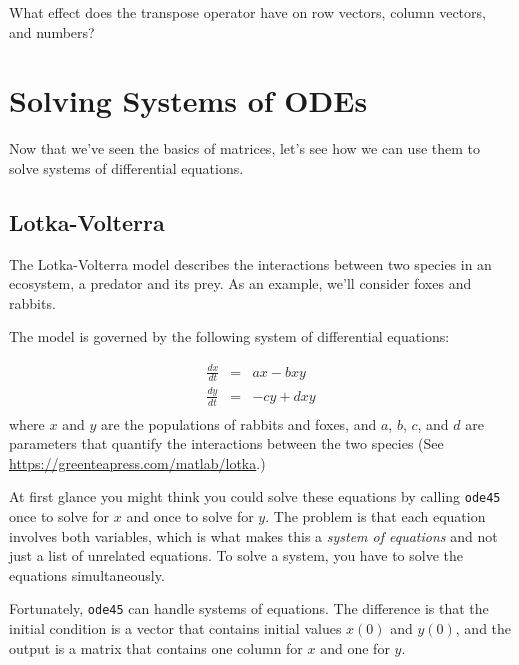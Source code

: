 \begin{ex}
What effect does the transpose operator
have on row vectors, column vectors, and numbers?
\end{ex}

\section{Solving Systems of ODEs}

Now that we've seen the basics of matrices, let's see how we can use them to solve systems of differential equations.

\subsection{Lotka-Volterra}
\label{lotka}

The Lotka-Volterra model describes the interactions between two
species in an ecosystem, a predator and its prey.  As an example, we'll consider foxes and rabbits.


The model is governed by the following system of differential equations:

\begin{eqnarray}
    \frac{dx}{dt} &=& a x - b x y         \\
    \frac{dy}{dt} &=& -c y + d x y       \\
\end{eqnarray}
%
where $x$ and $y$ are the populations of rabbits and foxes,
and $a$, $b$, $c$, and $d$ are parameters
that quantify the interactions between the two species (See
\url{https://greenteapress.com/matlab/lotka}.)

At first glance you might think you could solve these equations by
calling {\tt ode45} once to solve for $x$ and
once to solve for $y$.  The problem is that each equation involves
both variables, which is what makes this a {\em system of equations}
and not just a list of unrelated equations.  To solve a system, you
have to solve the equations simultaneously.


Fortunately, {\tt ode45} can handle systems of equations.  The
difference is that the initial condition is a vector that contains
initial values $x(0)$ and $y(0)$, and the output is a matrix
that contains one column for $x$ and one for $y$.

